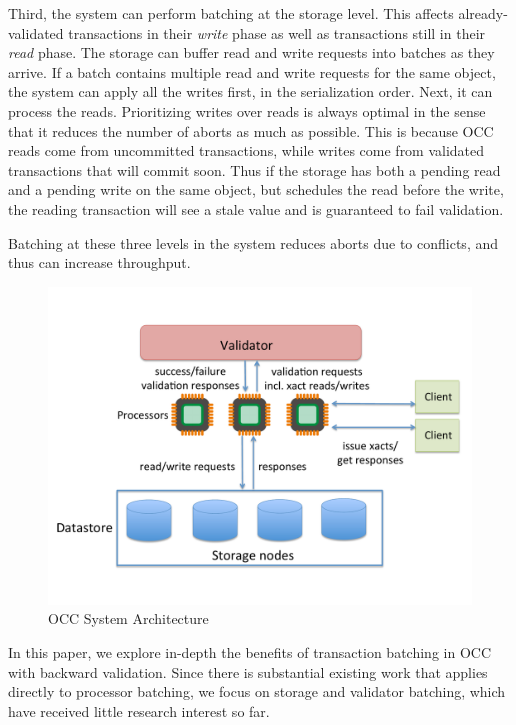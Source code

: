 Third, the system can perform batching at the storage level. This affects already-validated transactions in their \emph{write} phase as well as transactions still in their \emph{read} phase. The storage can buffer read and write requests into batches as they arrive. If a batch contains multiple read and write requests for the same object, the system can apply all the writes first, in the serialization order. Next, it can process the reads. Prioritizing writes over reads is always optimal in the sense that it reduces the number of aborts as much as possible. This is because OCC reads come from uncommitted transactions, while writes come from validated transactions that will commit soon. Thus if the storage has both a pending read and a pending write on the same object, but schedules the read before the write, the reading transaction will see a stale value and is guaranteed to fail validation. 

Batching at these three levels in the system reduces aborts due to conflicts, and thus can increase throughput.

\begin{figure}[t]
 \centering
 \includegraphics[width=0.7\columnwidth]{figures/OCCArchitecture.pdf}
 \vspace{-.5em}
 \caption{OCC System Architecture}
 \vspace{-1.5em}
 \label{fig:occ_arch}
\end{figure}


In this paper, we explore in-depth the benefits of transaction batching in OCC with backward validation. Since there is substantial existing work that applies directly to processor batching, we focus on storage and validator batching, which have received little research interest so far.

